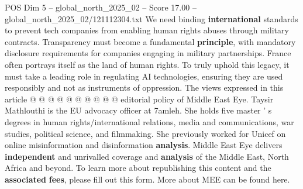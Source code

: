 \begin{textsample}{POS Dim 5 – global\_north\_2025\_02 – Score 17.00 – global\_north\_2025\_02/121112304.txt}
We need binding \textbf{international} standards to prevent tech companies from enabling human rights abuses through military contracts.
Transparency must become a fundamental \textbf{principle}, with mandatory disclosure requirements for companies engaging in military partnerships.
France often portrays itself as the land of human rights.
To truly uphold this legacy, it must take a leading role in regulating AI technologies, ensuring they are used responsibly and not as instruments of oppression.
The views expressed in this article @ @ @ @ @ @ @ @ @ @ editorial policy of Middle East Eye.
Taysir Mathlouthi is the EU advocacy officer at 7amleh.
She holds five master ' s degrees in human rights/international relations, media and communications, war studies, political science, and filmmaking.
She previously worked for Unicef on online misinformation and disinformation \textbf{analysis}.
Middle East Eye delivers \textbf{independent} and unrivalled coverage and \textbf{analysis} of the Middle East, North Africa and beyond.
To learn more about republishing this content and the \textbf{associated} \textbf{fees}, please fill out this form.
More about MEE can be found here.

\end{textsample}
